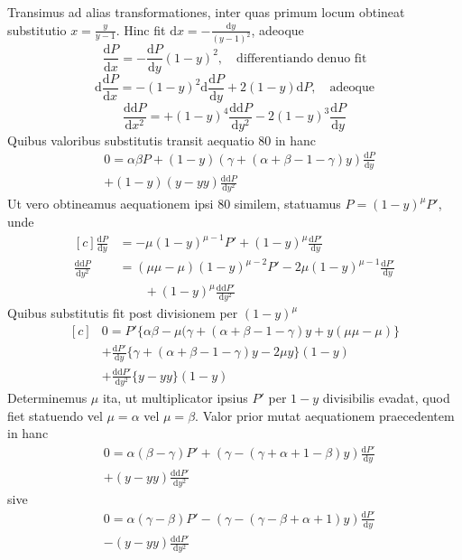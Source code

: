Transimus ad alias transformationes, inter quas primum locum obtineat
substitutio $x=\frac{y}{y-1}$. Hinc fit $\mathrm{d}x=-\frac{\mathrm{d}y}{(y-1)^2}$, adeoque
\[
\frac{\mathrm{d}P}{\mathrm{d}x}=-\frac{\mathrm{d}P}{\mathrm{d}y}(1-y)^2,
\quad\text{differentiando denuo fit}
\]
\[
\mathrm{d}\frac{\mathrm{d}P}{\mathrm{d}x}=-(1-y)^2\mathrm{d}\frac{\mathrm{d}P}{\mathrm{d}y}
+2(1-y)\mathrm{d}P,\quad\text{adeoque}
\]
\[
\frac{\mathrm{dd}P}{\mathrm{d}x^2}=+(1-y)^4\frac{\mathrm{dd}P}{\mathrm{d}y^2}
-2(1-y)^3\frac{\mathrm{d}P}{\mathrm{d}y}
\]
Quibus valoribus substitutis transit aequatio 80 in hanc
\[
\begin{aligned}&0=\alpha\beta P+(1-y)(\gamma+(\alpha+\beta-1-\gamma)y)\frac{\mathrm{d}P}{\mathrm{d}y}\\&+(1-y)(y-yy)\frac{\mathrm{dd}P}{\mathrm{d}y^2}\end{aligned}
\]
Ut vero obtineamus aequationem ipsi 80 similem, statuamus $P=(1-y)^\mu P'$, unde
\[
\begin{aligned}[c]
\frac{\mathrm{d}P}{\mathrm{d}y}
&=-\mu(1-y)^{\mu-1}P'+(1-y)^\mu\frac{\mathrm{d}P'}{\mathrm{d}y}\\
\frac{\mathrm{dd}P}{\mathrm{d}y^2}
&=(\mu\mu-\mu)(1-y)^{\mu-2}P'-2\mu(1-y)^{\mu-1}\frac{\mathrm{d}P'}{\mathrm{d}y}
\\&\qquad+(1-y)^\mu\frac{\mathrm{dd}P'}{\mathrm{d}y^2}
\end{aligned}
\]
Quibus substitutis fit post divisionem per $(1-y)^\mu$
\[
\begin{aligned}[c]
&0=P'\{\alpha\beta-\mu(\gamma+(\alpha+\beta-1-\gamma)y+y(\mu\mu-\mu)\}\\
&+\frac{\mathrm{d}P'}{\mathrm{d}y}\{\gamma+(\alpha+\beta-1-\gamma)y-2\mu y\}(1-y)\\
&+\frac{\mathrm{dd}P'}{\mathrm{d}y^2}\{y-yy\}(1-y)
\end{aligned}
\]
Determinemus $\mu$ ita, ut multiplicator ipsius $P'$ per $1-y$ divisibilis evadat,
quod fiet statuendo vel $\mu=\alpha$ vel $\mu=\beta$. Valor prior mutat aequationem praecedentem in hanc
\[
\begin{aligned}&0=\alpha(\beta-\gamma)P'+(\gamma-(\gamma+\alpha+1-\beta)y)\frac{\mathrm{d}P'}{\mathrm{d}y}\\&+(y-yy)\frac{\mathrm{dd}P'}{\mathrm{d}y^2}\end{aligned}
\]
sive
\[
\begin{aligned}&0=\alpha(\gamma-\beta)P'-(\gamma-(\gamma-\beta+\alpha+1)y)\frac{\mathrm{d}P'}{\mathrm{d}y}\\&-(y-yy)\frac{\mathrm{dd}P'}{\mathrm{d}y^2}\end{aligned}
\]
